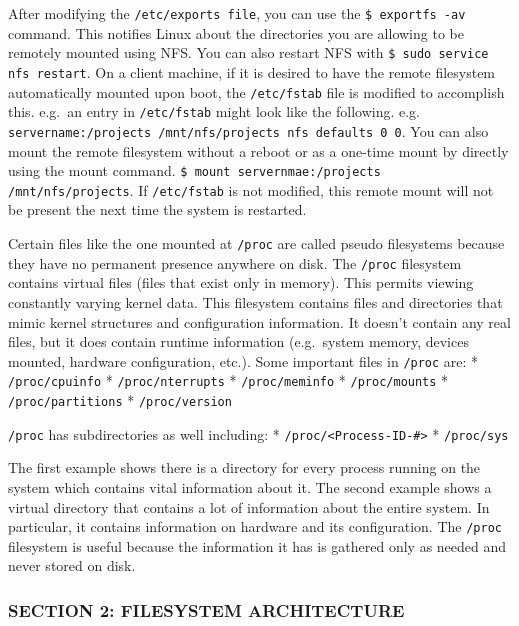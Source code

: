 After modifying the \texttt{/etc/exports file}, you can use the
\texttt{\$ exportfs -av} command. This notifies Linux about the
directories you are allowing to be remotely mounted using NFS. You can
also restart NFS with \texttt{\$ sudo service nfs restart}. On a client
machine, if it is desired to have the remote filesystem automatically
mounted upon boot, the \texttt{/etc/fstab} file is modified to
accomplish this. e.g.~an entry in \texttt{/etc/fstab} might look like
the following. e.g.
\texttt{servername:/projects /mnt/nfs/projects nfs defaults 0 0}. You
can also mount the remote filesystem without a reboot or as a one-time
mount by directly using the mount command.
\texttt{\$ mount servernmae:/projects /mnt/nfs/projects}. If
\texttt{/etc/fstab} is not modified, this remote mount will not be
present the next time the system is restarted.

Certain files like the one mounted at \texttt{/proc} are called pseudo
filesystems because they have no permanent presence anywhere on disk.
The \texttt{/proc} filesystem contains virtual files (files that exist
only in memory). This permits viewing constantly varying kernel data.
This filesystem contains files and directories that mimic kernel
structures and configuration information. It doesn't contain any real
files, but it does contain runtime information (e.g.~system memory,
devices mounted, hardware configuration, etc.). Some important files in
\texttt{/proc} are: * \texttt{/proc/cpuinfo} * \texttt{/proc/nterrupts}
* \texttt{/proc/meminfo} * \texttt{/proc/mounts} *
\texttt{/proc/partitions} * \texttt{/proc/version}

\texttt{/proc} has subdirectories as well including: *
\texttt{/proc/\textless{}Process-ID-\#\textgreater{}} *
\texttt{/proc/sys}

The first example shows there is a directory for every process running
on the system which contains vital information about it. The second
example shows a virtual directory that contains a lot of information
about the entire system. In particular, it contains information on
hardware and its configuration. The \texttt{/proc} filesystem is useful
because the information it has is gathered only as needed and never
stored on disk.

\subsubsection{SECTION 2: FILESYSTEM
ARCHITECTURE}\label{section-2-filesystem-architecture}

